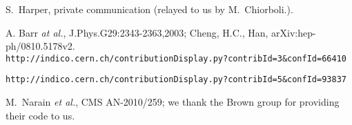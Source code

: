 \begin{thebibliography}{10}
 S.~Harper, private communication (relayed to us by M.~Chiorboli.).

 A. Barr {\em at al.}, J.Phys.G29:2343-2363,2003;
Cheng, H.C., Han, arXiv:hep-ph/0810.5178v2.\\
{\tt http://indico.cern.ch/contributionDisplay.py?contribId=3\&confId=66410}

 {\tt http://indico.cern.ch/contributionDisplay.py?contribId=5\&confId=93837}

 M.~Narain {\em et al.}, CMS AN-2010/259; we thank the 
Brown group for providing their code to us.


    
\end{thebibliography}
